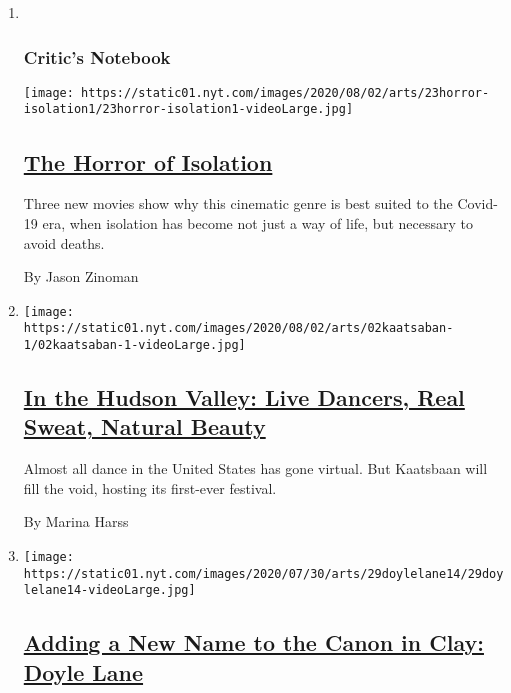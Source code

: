 \begin{enumerate}
\def\labelenumi{\arabic{enumi}.}
\item ~
  \hypertarget{critics-notebook-1}{%
  \subsubsection{Critic's Notebook}\label{critics-notebook-1}}

  \texttt{[image: https://static01.nyt.com/images/2020/08/02/arts/23horror-isolation1/23horror-isolation1-videoLarge.jpg]}

  \hypertarget{the-horror-of-isolation}{%
  \subsection{\texorpdfstring{\href{/2020/07/29/movies/horror-she-dies-tomorrow-relic-amulet.html}{The
  Horror of
  Isolation}}{The Horror of Isolation}}\label{the-horror-of-isolation}}

  Three new movies show why this cinematic genre is best suited to the
  Covid-19 era, when isolation has become not just a way of life, but
  necessary to avoid deaths.

  By Jason Zinoman
\item
  \texttt{[image: https://static01.nyt.com/images/2020/08/02/arts/02kaatsaban-1/02kaatsaban-1-videoLarge.jpg]}

  \hypertarget{in-the-hudson-valley-live-dancers-real-sweat-natural-beauty}{%
  \subsection{\texorpdfstring{\href{/2020/07/29/arts/dance/kaatsbaan-dance-festival-stella-abrera.html}{In
  the Hudson Valley: Live Dancers, Real Sweat, Natural
  Beauty}}{In the Hudson Valley: Live Dancers, Real Sweat, Natural Beauty}}\label{in-the-hudson-valley-live-dancers-real-sweat-natural-beauty}}

  Almost all dance in the United States has gone virtual. But Kaatsbaan
  will fill the void, hosting its first-ever festival.

  By Marina Harss
\item
  \texttt{[image: https://static01.nyt.com/images/2020/07/30/arts/29doylelane14/29doylelane14-videoLarge.jpg]}

  \hypertarget{adding-a-new-name-to-the-canon-in-clay-doyle-lane}{%
  \subsection{\texorpdfstring{\href{/2020/07/29/arts/design/doyle-lane-ceramics.html}{Adding
  a New Name to the Canon in Clay: Doyle
  Lane}}{Adding a New Name to the Canon in Clay: Doyle Lane}}\label{adding-a-new-name-to-the-canon-in-clay-doyle-lane}}


\end{enumerate}
